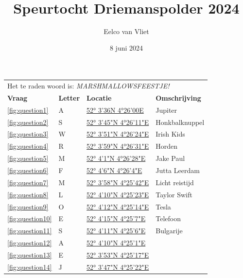 \documentclass{article}
\title{Speurtocht Driemanspolder 2024}
\author{Eelco van Vliet}
\date{8 juni 2024}
\newcommand{\locone}{52° 3'36N 4°26'00E}
\newcommand{\urlone}{https://forms.gle/88Jf8wcjFSU8aojt8}
\newcommand{\letterone}{A}
\newcommand{\noteone}{Jupiter}
\newcommand{\loctwo}{52° 3'45"N 4°26'11"E}
\newcommand{\urltwo}{https://forms.gle/jwE6WMcVdYzMEdi86}
\newcommand{\lettertwo}{S}
\newcommand{\notetwo}{Honkbalknuppel}
\newcommand{\locthree}{52° 3'51"N 4°26'24"E}
\newcommand{\urlthree}{https://forms.gle/kxh8LWZneB8L2Z3z6}
\newcommand{\letterthree}{W}
\newcommand{\notethree}{Irish Kids}
\newcommand{\locfour}{52° 3'59"N 4°26'31"E}
\newcommand{\urlfour}{https://forms.gle/V9HNHxqCGrrNP5G88}
\newcommand{\letterfour}{R}
\newcommand{\notefour}{Horden}
\newcommand{\locfive}{52° 4'1"N 4°26'28"E}
\newcommand{\urlfive}{https://forms.gle/BCt5xtiF92kuXUrbA}
\newcommand{\letterfive}{M}
\newcommand{\notefive}{Jake Paul}
\newcommand{\locsix}{52° 4'6"N 4°26'4"E}
\newcommand{\urlsix}{https://forms.gle/jiWuTPrYGa8ch47FA}
\newcommand{\lettersix}{F}
\newcommand{\notesix}{Jutta Leerdam}
\newcommand{\locseven}{52° 3'58"N 4°25'42"E}
\newcommand{\urlseven}{ https://forms.gle/ENjzGPWeKBaMmxDN7}
\newcommand{\letterseven}{M}
\newcommand{\noteseven}{Licht reistijd}
\newcommand{\loceight}{52° 4'10"N 4°25'23"E}
\newcommand{\urleight}{https://forms.gle/bpSmFds9fYMj3ThW8}
\newcommand{\lettereight}{L}
\newcommand{\noteeight}{Taylor Swift}
\newcommand{\locnine}{52° 4'12"N 4°25'14"E}
\newcommand{\urlnine}{https://forms.gle/2uKCzoAuqi3J1RTAA}
\newcommand{\letternine}{O}
\newcommand{\notenine}{Tesla}
\newcommand{\locten}{52° 4'15"N   4°25'7"E}
\newcommand{\urlten}{https://forms.gle/9iXk2sc3wtt69EMB7}
\newcommand{\letterten}{E}
\newcommand{\noteten}{Telefoon}
\newcommand{\loceleven}{52° 4'11"N   4°25'6"E}
\newcommand{\urleleven}{https://forms.gle/LuSmoGVzXbCgT9aH8}
\newcommand{\lettereleven}{S}
\newcommand{\noteeleven}{Bulgarije}
\newcommand{\loctwelve}{52° 4'10"N   4°25'1"E}
\newcommand{\urltwelve}{https://example.com}
\newcommand{\lettertwelve}{A}
\newcommand{\notetwelve}{}
\newcommand{\locthirteen}{52° 3'53"N   4°25'17"E}
\newcommand{\urlthirteen}{https://example.com}
\newcommand{\letterthirteen}{E}
\newcommand{\notethirteen}{}
\newcommand{\locfourteen}{52° 3'47"N   4°25'22"E}
\newcommand{\urlfourteen}{https://example.com}
\newcommand{\letterfourteen}{J}
\newcommand{\notefourteen}{}
\begin{document}
    \maketitle
        \begin{tabular}{llll}
            \toprule
            \multicolumn{4}{l}{Het te raden woord is: \emph{MARSHMALLOWSFEESTJE!}} \\
            \textbf{Vraag} & \textbf{Letter} & \textbf{Locatie} & \textbf{Omschrijving} \\
            \midrule
             \ref{fig:question1} & \letterone & \href{\urlone}{\locone} & \noteone \\
            \ref{fig:question2} & \lettertwo & \href{\urltwo}{\loctwo} & \notetwo \\
            \ref{fig:question3} & \letterthree & \href{\urlthree}{\locthree} & \notethree  \\
            \ref{fig:question4} & \letterfour  & \href{\urlfour}{\locfour} & \notefour \\
            \ref{fig:question5} & \letterfive  & \href{\urlfive}{\locfive} & \notefive \\
            \ref{fig:question6} & \lettersix  & \href{\urlsix}{\locsix} & \notesix \\
            \ref{fig:question7} & \letterseven  & \href{\urlseven}{\locseven} & \noteseven \\
            \ref{fig:question8} & \lettereight  & \href{\urleight}{\loceight} & \noteeight \\
            \ref{fig:question9} & \letternine  & \href{\urlnine}{\locnine} & \notenine \\
            \ref{fig:question10} & \letterten  & \href{\urlten}{\locten} & \noteten \\
            \ref{fig:question11} & \lettereleven  & \href{\urleleven}{\loceleven} & \noteeleven \\
            \ref{fig:question12} & \lettertwelve  & \href{\urltwelve}{\loctwelve} & \notetwelve \\
            \ref{fig:question13} & \letterthirteen  & \href{\urlthirteen}{\locthirteen} & \notethirteen \\
            \ref{fig:question14} & \letterfourteen  & \href{\urlfourteen}{\locfourteen} & \notefourteen \\

\end{tabular}
\end{document}
